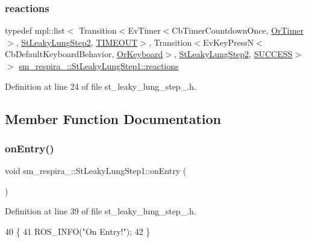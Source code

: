 \subsubsection{\texorpdfstring{reactions}{reactions}}
{\footnotesize\ttfamily typedef mpl\+::list$<$ Transition$<$Ev\+Timer$<$Cb\+Timer\+Countdown\+Once, \hyperlink{classsm__respira__1_1_1OrTimer}{Or\+Timer}$>$, \hyperlink{structsm__respira__1_1_1StLeakyLungStep2}{St\+Leaky\+Lung\+Step2}, \hyperlink{structsm__respira__1_1_1StLeakyLungStep1_1_1TIMEOUT}{T\+I\+M\+E\+O\+UT}$>$, Transition$<$Ev\+Key\+PressN$<$Cb\+Default\+Keyboard\+Behavior, \hyperlink{classsm__respira__1_1_1OrKeyboard}{Or\+Keyboard}$>$, \hyperlink{structsm__respira__1_1_1StLeakyLungStep2}{St\+Leaky\+Lung\+Step2}, \hyperlink{classSUCCESS}{S\+U\+C\+C\+E\+SS}$>$ $>$ \hyperlink{structsm__respira__1_1_1StLeakyLungStep1_a7db4fb4dc25a1c7b41ed9b364445ddec}{sm\+\_\+respira\+\_\+::\+St\+Leaky\+Lung\+Step1\+::reactions}}



Definition at line 24 of file st\+\_\+leaky\+\_\+lung\+\_\+step\+\_.\+h.



\subsection{Member Function Documentation}
\mbox{\label{structsm__respira__1_1_1StLeakyLungStep1_aacb7c33d583b637b4f10164bad7e703c}} 
\subsubsection{\texorpdfstring{on\+Entry()}{onEntry()}}
{\footnotesize\ttfamily void sm\+\_\+respira\+\_\+::\+St\+Leaky\+Lung\+Step1\+::on\+Entry (\begin{DoxyParamCaption}{ }\end{DoxyParamCaption})\hspace{0.3cm}{\ttfamily [inline]}}



Definition at line 39 of file st\+\_\+leaky\+\_\+lung\+\_\+step\+\_.\+h.


\begin{DoxyCode}
40     \{
41         ROS\_INFO(\textcolor{stringliteral}{"On Entry!"});
42     \}
\end{DoxyCode}
\mbox{\label{structsm__respira__1_1_1StLeakyLungStep1_a240d20f059cbc41d8b85bf0ac699f1d1}} 
